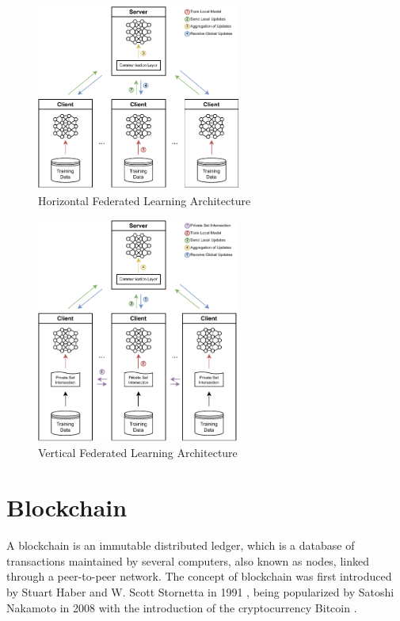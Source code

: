 \begin{figure}[!htp]
    \centering
    \centering
    \includegraphics[width=0.6\textwidth]{graphics/hfl-architecture.pdf}
    \caption{Horizontal Federated Learning Architecture}
    \label{fig:hfl_arch}
\end{figure}

\begin{figure}[!hbp]
    \centering
    \centering
    \includegraphics[width=0.6\textwidth]{graphics/vfl-architecture.pdf}
    \caption{Vertical Federated Learning Architecture}
    \label{fig:vfl_arch}
\end{figure}

\section{Blockchain}\label{background:blockchain}

A blockchain is an immutable distributed ledger, which is a database of transactions maintained by several computers, also known as nodes, linked through a peer-to-peer network. The concept of blockchain was first introduced by Stuart Haber and W. Scott Stornetta in 1991 \cite{10.48550/ARXIV.1810.06130}, being popularized by Satoshi Nakamoto in 2008 with the introduction of the cryptocurrency Bitcoin \cite{nakamoto2009bitcoin}.

